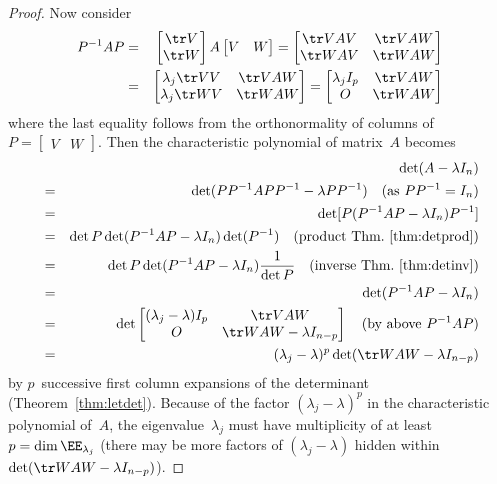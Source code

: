 \begin{proof}
Now consider
\begin{eqnarray*}
P^{-1}AP
&=&\begin{bmatrix} \tr V\\\tr W \end{bmatrix}A\begin{bmatrix} V&W \end{bmatrix}
=\begin{bmatrix} \tr VAV&\tr VAW\\\tr WAV&\tr WAW \end{bmatrix}
\\
&=&\begin{bmatrix} \lambda_j\tr VV&\tr VAW\\\lambda_j\tr WV&\tr WAW \end{bmatrix}
=\begin{bmatrix} \lambda_jI_p&\tr VAW\\O&\tr WAW \end{bmatrix}
\end{eqnarray*}
where the last equality follows from the orthonormality of columns of \(P=\begin{bmatrix} V&W \end{bmatrix}\).
Then the characteristic polynomial of matrix~\(A\) becomes
\begin{eqnarray*}
&&\hspace{-1.5em}\det(A-\lambda I_n)
\\&=&\det(PP^{-1}APP^{-1}-\lambda PP^{-1})
\quad(\text{as }PP^{-1}=I_n)
\\&=&\det[P(P^{-1}AP-\lambda I_n)P^{-1}]
\\&=&\det P\det(P^{-1}AP-\lambda I_n)\det(P^{-1})
\quad(\text{product Thm.~\ref{thm:detprod}})
\\&=&\det P\det(P^{-1}AP-\lambda I_n)\frac1{\det P}
\quad(\text{inverse Thm.~\ref{thm:detinv}})
\\&=&\det(P^{-1}AP-\lambda I_n)
\\&=&\det\begin{bmatrix} (\lambda_j-\lambda)I_p&\tr VAW\\O&\tr WAW -\lambda I_{n-p}\end{bmatrix}
\quad(\text{by above }P^{-1}AP)
\\&=&(\lambda_j-\lambda)^p\det(\tr WAW -\lambda I_{n-p})
\end{eqnarray*}
by \(p\)~successive first column expansions of the determinant (Theorem~\ref{thm:letdet}).
Because of the factor \((\lambda_j-\lambda)^p\) in the characteristic polynomial of~\(A\), the eigenvalue~\(\lambda_j\) must have multiplicity of at least~\(p=\dim\EE_{\lambda_j}\)
(there may be more factors of \((\lambda_j-\lambda)\) hidden within \(\det(\tr WAW -\lambda I_{n-p})\)).
\end{proof}



